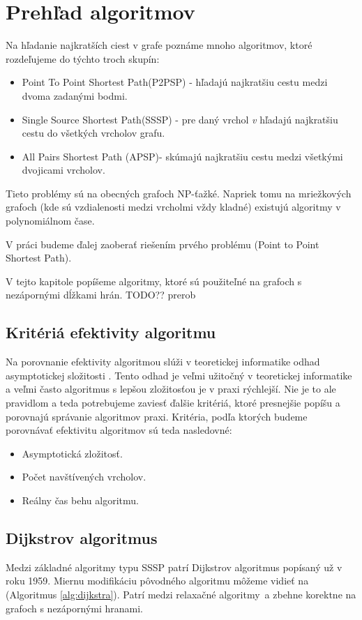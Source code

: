 \chapter{Prehľad algoritmov}
Na hľadanie najkratších ciest v grafe poznáme mnoho algoritmov, ktoré rozdeľujeme do týchto troch \cite{mares07} skupín: 


\begin{itemize}
\item Point To Point Shortest Path(P2PSP) - hľadajú najkratšiu cestu medzi dvoma zadanými bodmi.
\item Single Source Shortest Path(SSSP) - pre daný vrchol {\sl v} hľadajú najkratšiu cestu do všetkých vrcholov grafu.
\item All Pairs Shortest Path (APSP)- skúmajú najkratšiu cestu medzi všetkými dvojicami vrcholov.
\end{itemize}

Tieto problémy sú na obecných grafoch NP-ťažké.
Napriek tomu na mriežkových grafoch (kde sú vzdialenosti medzi vrcholmi vždy kladné) existujú algoritmy v polynomiálnom čase.

V práci budeme ďalej zaoberať riešením prvého problému (Point to Point Shortest Path). 

V tejto kapitole popíšeme algoritmy, ktoré sú použiteľné na grafoch s nezápornými dĺžkami hrán. TODO?? prerob


\section{Kritériá efektivity algoritmu}
Na porovnanie efektivity algoritmou slúži v teoretickej informatike odhad asymptotickej složitosti \cite{asymptotic65}.
Tento odhad je veľmi užitočný v teoretickej informatike a veľmi často algoritmus s lepšou zložitosťou je v praxi rýchlejší.
Nie je to ale pravidlom a teda potrebujeme zaviesť ďalšie kritériá, ktoré presnejšie popíšu a porovnajú správanie algoritmov praxi.
Kritéria, podľa ktorých budeme porovnávať efektivitu algoritmov sú teda nasledovné:
\begin{itemize}
	\item Asymptotická zložitosť.
	\item Počet navštívených vrcholov.
	\item Reálny čas behu algoritmu.
\end{itemize}



\section{Dijkstrov algoritmus}
Medzi základné algoritmy typu SSSP patrí Dijkstrov algoritmus \cite{dijkstra59} popísaný už v roku 1959. 
Miernu modifikáciu pôvodného algoritmu môžeme vidieť na (Algoritmus \ref{alg:dijkstra}). 
Patrí medzi relaxačné algoritmy~a zbehne korektne na grafoch
s nezápornými hranami.

